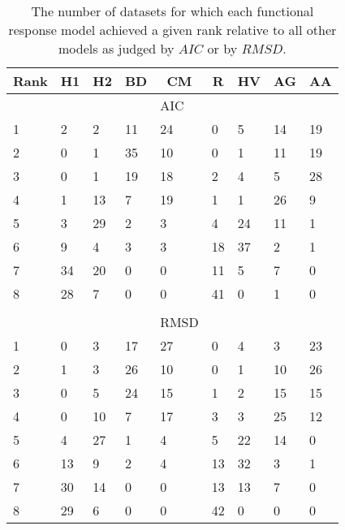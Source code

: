 \begin{table}[!tbp]
\caption{The number of datasets for which each functional response model achieved a given rank relative to all other models as judged by $AIC$ or by $RMSD$.\label{table:AIC_and_RMSD_rankings}} 
\begin{center}
\begin{tabular}{lllllllll}
\hline\hline
\multicolumn{1}{l}{Rank}&\multicolumn{1}{c}{H1}&\multicolumn{1}{c}{H2}&\multicolumn{1}{c}{BD}&\multicolumn{1}{c}{CM}&\multicolumn{1}{c}{R}&\multicolumn{1}{c}{HV}&\multicolumn{1}{c}{AG}&\multicolumn{1}{c}{AA}\tabularnewline
\hline
&&&&AIC&&&&\tabularnewline
1&2&2&11&24&0&5&14&19\tabularnewline
2&0&1&35&10&0&1&11&19\tabularnewline
3&0&1&19&18&2&4&5&28\tabularnewline
4&1&13&7&19&1&1&26&9\tabularnewline
5&3&29&2&3&4&24&11&1\tabularnewline
6&9&4&3&3&18&37&2&1\tabularnewline
7&34&20&0&0&11&5&7&0\tabularnewline
8&28&7&0&0&41&0&1&0\tabularnewline
&&&&&&&&\tabularnewline
&&&&RMSD&&&&\tabularnewline
1&0&3&17&27&0&4&3&23\tabularnewline
2&1&3&26&10&0&1&10&26\tabularnewline
3&0&5&24&15&1&2&15&15\tabularnewline
4&0&10&7&17&3&3&25&12\tabularnewline
5&4&27&1&4&5&22&14&0\tabularnewline
6&13&9&2&4&13&32&3&1\tabularnewline
7&30&14&0&0&13&13&7&0\tabularnewline
8&29&6&0&0&42&0&0&0\tabularnewline
\hline
\end{tabular}\end{center}
\end{table}
